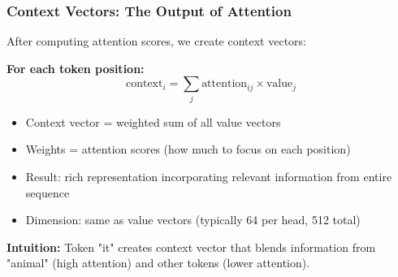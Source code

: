 \begin{frame}[fragile]\frametitle{Context Vectors: The Output of Attention}

After computing attention scores, we create context vectors:

\textbf{For each token position:}
$$\text{context}_i = \sum_{j} \text{attention}_{ij} \times \text{value}_j$$

\begin{itemize}
\item Context vector = weighted sum of all value vectors
\item Weights = attention scores (how much to focus on each position)
\item Result: rich representation incorporating relevant information from entire sequence
\item Dimension: same as value vectors (typically 64 per head, 512 total)
\end{itemize}

\textbf{Intuition:} Token "it" creates context vector that blends information from "animal" (high attention) and other tokens (lower attention).
\end{frame}












			
